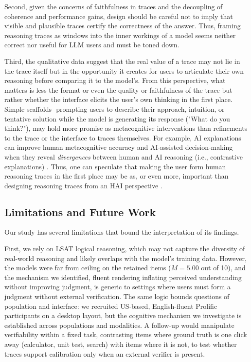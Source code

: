 \documentclass[manuscript, anonymous=false,authorversion,review=false]{acmart}
\begin{document}
Second, given the concerns of faithfulness in traces and the decoupling of coherence and performance gains, design should be careful not to imply that visible and plausible traces certify the correctness of the answer. Thus, framing reasoning traces as windows into the inner workings of a model seems neither correct \cite{10.5555/3666122.3669397,lindsey2025biology, barez2025chain} nor useful for LLM users and must be toned down.%

Third, the qualitative data suggest that the real value of a trace may not lie in the trace itself but in the opportunity it creates for users to articulate their own reasoning before comparing it to the model's. From this perspective, what matters is less the format or even the quality or faithfulness of the trace but rather whether the interface elicits the user's own thinking in the first place. Simple scaffolds- 
prompting users to describe their approach, intuition, or tentative solution while the model is generating its response ("What do you think?"), may hold more promise as metacognitive interventions than refinements to the trace or the interface to traces themselves. For example, AI explanations can improve human metacognitive accuracy and AI-assisted decision-making when they reveal \textit{divergences} between human and AI reasoning (i.e., contrastive explanations) \cite{von2025knowing, buccinca2025contrastive, si2024large}. Thus, one can speculate that making the user form human reasoning traces in the first place may be as, or even more, important than designing reasoning traces from an HAI perspective \cite{FERNANDES2026108779}.



\subsection{Limitations and Future Work}

Our study has several limitations that bound the interpretation of its findings.

First, we rely on LSAT logical reasoning, which may not capture the diversity of real-world reasoning and likely overlaps with the model's training data. However, the models were far from ceiling on the retained items ($M = 5.00$ out of 10), and the mechanism we identified, fluent rendering inflating perceived understanding without improving judgment, is generic to settings where users must form a judgment without external verification. The same logic bounds questions of population and interface: we recruited US-based, English-fluent Prolific participants on a desktop layout, but the cognitive mechanism we investigate is established across populations and modalities. A follow-up would manipulate verifiability within a fixed task, contrasting items where ground truth is one click away (calculator, unit test, search) with items where it is not, to test whether traces support calibration only when an external verifier is present.
\end{document}
